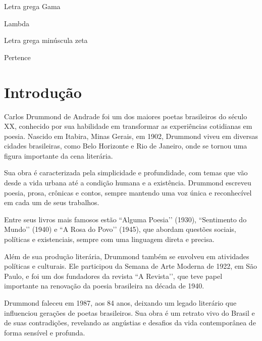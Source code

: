 \documentclass[12pt, openright,	oneside, a4paper, english, french, spanish, brazil]{abntex2}
\begin{document}
\begin{simbolos}
  \item[$ \Gamma $] Letra grega Gama
  \item[$ \Lambda $] Lambda
  \item[$ \zeta $] Letra grega minúscula zeta
  \item[$ \in $] Pertence
\end{simbolos}

\tableofcontents*
\cleardoublepage
\textual

\chapter{Introdução}
\label{capitulo-introducao}
Carlos Drummond de Andrade foi um dos maiores poetas brasileiros do século XX, conhecido por sua habilidade em transformar as experiências cotidianas em poesia. Nascido em Itabira, Minas Gerais, em 1902, Drummond viveu em diversas cidades brasileiras, como Belo Horizonte e Rio de Janeiro, onde se tornou uma figura importante da cena literária.

Sua obra é caracterizada pela simplicidade e profundidade, com temas que vão desde a vida urbana até a condição humana e a existência. Drummond escreveu poesia, prosa, crônicas e contos, sempre mantendo uma voz única e reconhecível em cada um de seus trabalhos.

Entre seus livros mais famosos estão ``Alguma Poesia’’ (1930), ``Sentimento do Mundo’’ (1940) e ``A Rosa do Povo’’ (1945), que abordam questões sociais, políticas e existenciais, sempre com uma linguagem direta e precisa.

Além de sua produção literária, Drummond também se envolveu em atividades políticas e culturais. Ele participou da Semana de Arte Moderna de 1922, em São Paulo, e foi um dos fundadores da revista ``A Revista’’, que teve papel importante na renovação da poesia brasileira na década de 1940.

Drummond faleceu em 1987, aos 84 anos, deixando um legado literário que influenciou gerações de poetas brasileiros. Sua obra é um retrato vivo do Brasil e de suas contradições, revelando as angústias e desafios da vida contemporânea de forma sensível e profunda.
\end{document}
